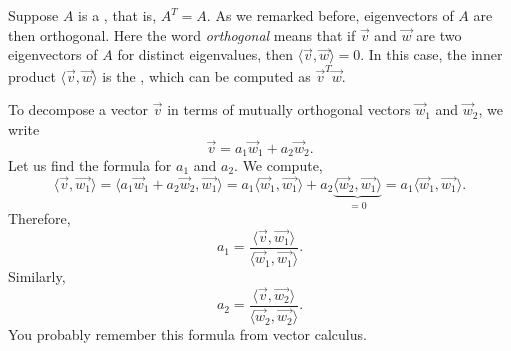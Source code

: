 Suppose $A$ is a \emph{},
that is, $A^T = A$.  As we remarked before, 
eigenvectors of $A$ are then orthogonal.  Here the word
\emph{orthogonal} means
that if $\vec{v}$ and $\vec{w}$ are two 
eigenvectors of $A$ for distinct eigenvalues,
then $\langle \vec{v} , \vec{w} \rangle = 0$.
In this case, the inner product $\langle \vec{v} , \vec{w} \rangle$
is the \emph{},
which can be computed as $\vec{v}^T\vec{w}$.

To decompose a vector $\vec{v}$ in terms of mutually orthogonal
vectors $\vec{w}_1$ and $\vec{w}_2$, we write
\begin{equation*}
\vec{v} = a_1 \vec{w}_1  + a_2 \vec{w}_2 .
\end{equation*}
Let us find the formula for $a_1$ and $a_2$.  We compute,
\begin{equation*}
\langle \vec{v} , \vec{w_1} \rangle
=
\langle a_1 \vec{w}_1  + a_2 \vec{w}_2 , \vec{w_1} \rangle
=
a_1 \langle \vec{w}_1 , \vec{w_1} \rangle
+
a_2 \underbrace{\langle \vec{w}_2 , \vec{w_1} \rangle}_{=0}
=
a_1 \langle \vec{w}_1 , \vec{w_1} \rangle .
\end{equation*}
Therefore,
\begin{equation*}
a_1 = 
\frac{\langle \vec{v} , \vec{w_1} \rangle}{
\langle \vec{w}_1 , \vec{w_1} \rangle} .
\end{equation*}
Similarly,
\begin{equation*}
a_2 = 
\frac{\langle \vec{v} , \vec{w_2} \rangle}{
\langle \vec{w}_2 , \vec{w_2} \rangle} .
\end{equation*}
You probably remember this formula from vector calculus.

